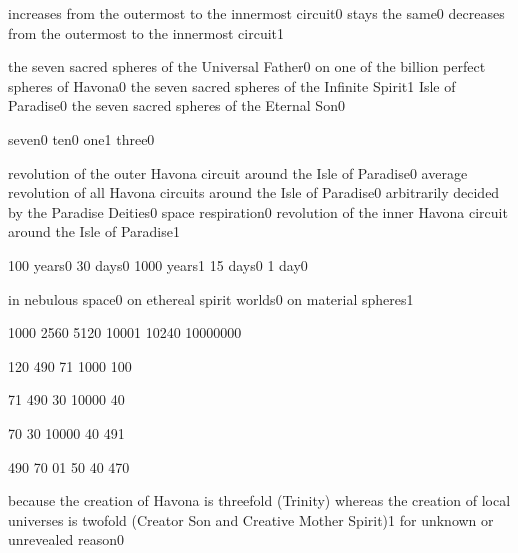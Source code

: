 {increases from the outermost to the innermost circuit}{0}
{stays the same}{0}
{decreases from the outermost to the innermost circuit}{1}
\qstop

{the seven sacred spheres of the Universal Father}{0}
{on one of the billion perfect spheres of Havona}{0}
{the seven sacred spheres of the Infinite Spirit}{1}
{Isle of Paradise}{0}
{the seven sacred spheres of the Eternal Son}{0}
\qstop

{seven}{0}
{ten}{0}
{one}{1}
{three}{0}
\qstop

{revolution of the outer Havona circuit around the Isle of Paradise}{0}
{average revolution of all Havona circuits around the Isle of Paradise}{0}
{arbitrarily decided by the Paradise Deities}{0}
{space respiration}{0}
{revolution of the inner Havona circuit around the Isle of Paradise}{1}
\qstop


{100 years}{0}
{30 days}{0}
{1000 years}{1}
{15 days}{0}
{1 day}{0}
\qstop

{in nebulous space}{0}
{on ethereal spirit worlds}{0}
{on material spheres}{1}
\qstop

{100}{0}
{256}{0}
{512}{0}
{1000}{1}
{1024}{0}
{1000000}{0}
\qstop

{12}{0}
{49}{0}
{7}{1}
{100}{0}
{10}{0}
\qstop

{7}{1}
{49}{0}
{3}{0}
{1000}{0}
{4}{0}
\qstop

{7}{0}
{3}{0}
{1000}{0}
{4}{0}
{49}{1}
\qstop

{49}{0}
{7}{0}
{0}{1}
{5}{0}
{4}{0}
{47}{0}
\qstop

{because the creation of Havona is threefold (Trinity) whereas the creation of local universes is twofold (Creator Son and Creative Mother Spirit)}{1}
{for unknown or unrevealed reason}{0}
\qstop


